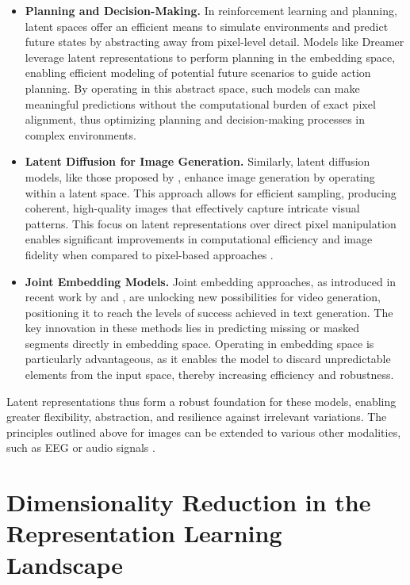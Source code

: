 \begin{itemize}
    \item \textbf{Planning and Decision-Making.} In reinforcement learning and planning, latent spaces offer an efficient means to simulate environments and predict future states by abstracting away from pixel-level detail. Models like Dreamer \citep{hafner2019dream} leverage latent representations to perform planning in the embedding space, enabling efficient modeling of potential future scenarios to guide action planning. By operating in this abstract space, such models can make meaningful predictions without the computational burden of exact pixel alignment, thus optimizing planning and decision-making processes in complex environments.
    
    \item \textbf{Latent Diffusion for Image Generation.} Similarly, latent diffusion models, like those proposed by \cite{rombach2022high}, enhance image generation by operating within a latent space. This approach allows for efficient sampling, producing coherent, high-quality images that effectively capture intricate visual patterns. This focus on latent representations over direct pixel manipulation enables significant improvements in computational efficiency and image fidelity when compared to pixel-based approaches \citep{song2020score}.
    
    \item \textbf{Joint Embedding Models.} Joint embedding approaches, as introduced in recent work by \citep{assran2023self} and \citep{bardes2023v}, are unlocking new possibilities for video generation, positioning it to reach the levels of success achieved in text generation. The key innovation in these methods lies in predicting missing or masked segments directly in embedding space. Operating in embedding space is particularly advantageous, as it enables the model to discard unpredictable elements from the input space, thereby increasing efficiency and robustness.
\end{itemize}

Latent representations thus form a robust foundation for these models, enabling greater flexibility, abstraction, and resilience against irrelevant variations. The principles outlined above for images can be extended to various other modalities, such as EEG \citep{guetschel2024s} or audio signals \citep{niizumi2021byol}.

\section{Dimensionality Reduction in the Representation Learning Landscape}

